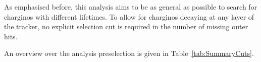 As emphasised before, this analysis aims to be as general as possible to search for charginos with different lifetimes.
To allow for charginos decaying at any layer of the tracker, no explicit selection cut is required in the number of missing outer hits.


An overview over the analysis preselection is given in Table~\ref{tab:SummaryCuts}. 
\renewcommand{\arraystretch}{1.39}
\begin{table}[!h]
\centering
\caption{Summary and categorisation of the analysis selection.}
\label{tab:SummaryCuts}
\end{table}
